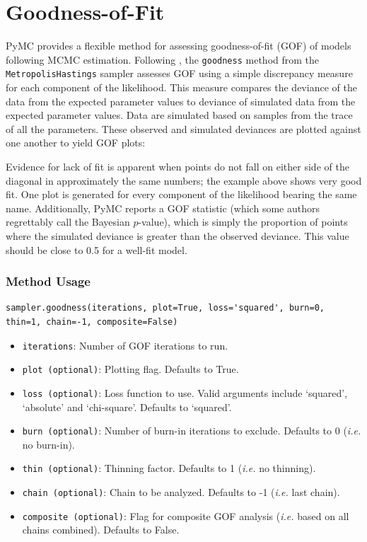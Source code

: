\documentclass[]{book}
\begin{document}
\section{Goodness-of-Fit}

PyMC provides a flexible method for assessing goodness-of-fit (GOF) of models following MCMC estimation. Following \citet{Gelman:1996gp}, the \verb=goodness= method from the \verb=MetropolisHastings= sampler assesses GOF using a simple discrepancy measure for each component of the likelihood. This measure compares the deviance of the data from the expected parameter values to deviance of simulated data from the expected parameter values. Data are simulated based on samples from the trace of all the parameters. These observed and simulated deviances are plotted against one another to yield GOF plots:

Evidence for lack of fit is apparent when points do not fall on either side of the diagonal in approximately the same numbers; the example above shows very good fit. One plot is generated for every component of the likelihood bearing the same name. Additionally, PyMC reports a GOF statistic (which some authors regrettably call the Bayesian $p$-value), which is simply the proportion of points where the simulated deviance is greater than the observed deviance. This value should be close to 0.5 for a well-fit model.

\subsubsection{Method Usage}
\begin{verbatim}
sampler.goodness(iterations, plot=True, loss='squared', burn=0, thin=1, chain=-1, composite=False)
\end{verbatim}

\begin{itemize}

\item \verb=iterations=: Number of GOF iterations to run.

\item \verb=plot (optional)=: Plotting flag. Defaults to True.

\item \verb=loss (optional)=: Loss function to use. Valid arguments include ‘squared’, ‘absolute’ and ‘chi-square’. Defaults to ‘squared’.

\item \verb=burn (optional)=: Number of burn-in iterations to exclude. Defaults to 0 (\emph{i.e.} no burn-in).

\item \verb=thin (optional)=: Thinning factor. Defaults to 1 (\emph{i.e.} no thinning).

\item \verb=chain (optional)=: Chain to be analyzed. Defaults to -1 (\emph{i.e.} last chain).

\item \verb=composite (optional)=: Flag for composite GOF analysis (\emph{i.e.} based on all chains combined). Defaults to False.
\end{itemize}
 
\end{document}
